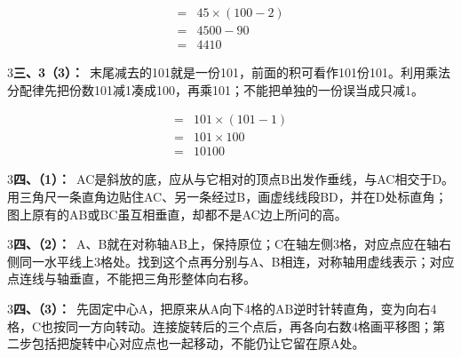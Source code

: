 \documentclass[multi=snippet,border={5bp 20bp 5bp 5bp}]{standalone}
\newenvironment{snippet}[3]{\begin{minipage}{#1bp}\color{answerred}\fontsize{#2}{#3}\selectfont\raggedright}{\end{minipage}}
\begin{document}
\begin{snippet}{110.233}{10.5}{12.8}\SourceSans\setlength{\mathindent}{2bp}\[\begin{aligned}={}&45\times(100-2)\\={}&4500-90\\={}&4410\end{aligned}\]\end{snippet}
\begin{snippet}{505}{11.5}{14}\begin{multicols}{3}\raggedcolumns \textbf{三、3（3）：}\ 末尾减去的101就是一份101，前面的积可看作101份101。利用乘法分配律先把份数101减1凑成100，再乘101；不能把单独的一份误当成只减1。\end{multicols}\end{snippet}
\begin{snippet}{184.567}{10.5}{12.8}\SourceSans\setlength{\mathindent}{2bp}\[\begin{aligned}={}&101\times(101-1)\\={}&101\times100\\={}&10100\end{aligned}\]\end{snippet}
\begin{snippet}{505}{11.5}{14}\begin{multicols}{3}\raggedcolumns \textbf{四、（1）：}\ AC是斜放的底，应从与它相对的顶点B出发作垂线，与AC相交于D。用三角尺一条直角边贴住AC、另一条经过B，画虚线线段BD，并在D处标直角；图上原有的AB或BC虽互相垂直，却都不是AC边上所问的高。\end{multicols}\end{snippet}
\begin{snippet}{505}{11.5}{14}\begin{multicols}{3}\raggedcolumns \textbf{四、（2）：}\ A、B就在对称轴AB上，保持原位；C在轴左侧3格，对应点应在轴右侧同一水平线上3格处。找到这个点再分别与A、B相连，对称轴用虚线表示；对应点连线与轴垂直，不能把三角形整体向右移。\end{multicols}\end{snippet}
\begin{snippet}{505}{11.5}{14}\begin{multicols}{3}\raggedcolumns \textbf{四、（3）：}\ 先固定中心A，把原来从A向下4格的AB逆时针转直角，变为向右4格，C也按同一方向转动。连接旋转后的三个点后，再各向右数4格画平移图；第二步包括把旋转中心对应点也一起移动，不能仍让它留在原A处。\end{multicols}\end{snippet}
\end{document}
